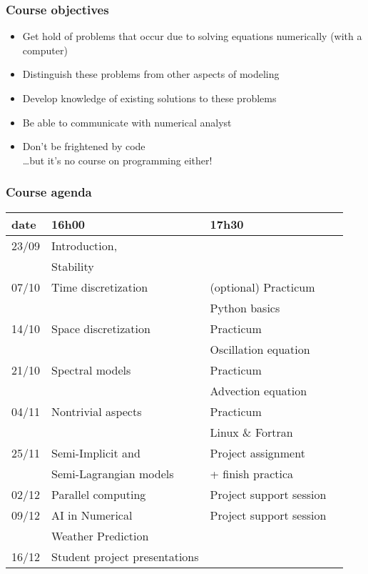 \documentclass[aspectratio=43,9pt]{beamer}
\begin{document}
%
%
\begin{frame}
	\frametitle{Course objectives}
	\begin{itemize}
		\item Get hold of problems that occur due to solving equations numerically (with a computer)\\[3ex]
\pause
		\item Distinguish these problems from other aspects of modeling
		\item Develop knowledge of existing solutions to these problems
		\item Be able to communicate with numerical analyst\\[3ex]
\pause
		\item Don't be frightened by code\\ \quad\ldots but it's no course on programming either!
	\end{itemize}
\end{frame}
%
%
\begin{frame}
	\frametitle{Course agenda}
	\vspace*{-5mm}
	\begin{center}
		\def\arraystretch{1.3}
		\begin{tabular}{l|lll}
			date	&	16h00	&	17h30 \\
		\hline
			23/09 	& Introduction, \\[-4pt]
					& Stability	\\
			07/10	& Time discretization		&	(optional) Practicum	\\[-4pt]
					&							&	Python basics			\\
			14/10	& Space discretization		&	Practicum				\\[-4pt]
					& 							&	Oscillation equation	\\
			21/10	& Spectral models			& 	Practicum				\\[-4pt]
					&							&	Advection equation 		\\
			04/11	& Nontrivial aspects		&	Practicum				\\[-4pt]
					& 							&	Linux \& Fortran		\\
			25/11	& Semi-Implicit and		 	&	Project assignment		\\[-4pt]
					& Semi-Lagrangian models	&	+ finish practica       \\
		\hline
			02/12	& Parallel computing	    &	Project support session \\
			09/12	& AI in Numerical           &   Project support session	\\[-4pt]
			        & Weather Prediction        &   \\
			16/12	& Student project presentations
		\end{tabular}
		\def\arraystretch{1}
	\end{center}
\end{frame}
\end{document}
